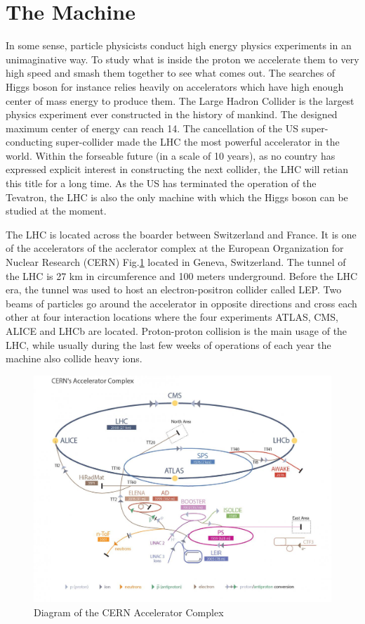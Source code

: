 \section{The Machine}

In some sense, particle physicists conduct high energy physics experiments in an unimaginative way. To study what is inside the proton we accelerate them to very high speed and smash them together to see what comes out. The searches of Higgs boson for instance relies heavily on accelerators which have high enough center of mass energy to produce them. The Large Hadron Collider is the largest physics experiment ever constructed in the history of mankind. The designed maximum center of energy can reach 14\tev. The cancellation of the US super-conducting super-collider made the LHC the most powerful accelerator in the world. Within the forseable future (in a scale of 10 years), as no country has expressed explicit interest in constructing the next collider, the LHC will retian this title for a long time. As the US has terminated the operation of the Tevatron, the LHC is also the only machine with which the Higgs boson can be studied at the moment.

The LHC is located across the boarder between Switzerland and France. It is one of the accelerators of the acclerator complex at the European Organization for Nuclear Research (CERN) Fig.\ref{fig:lhc-CERN} located in Geneva, Switzerland. The tunnel of the LHC is 27 km in circumference and 100 meters underground. Before the LHC era, the tunnel was used to host an electron-positron collider called LEP\cite{refneeded}. Two beams of particles go around the accelerator in opposite directions and cross each other at four interaction locations where the four experiments ATLAS, CMS, ALICE and LHCb are located. Proton-proton collision is the main usage of the LHC, while usually during the last few weeks of operations of each year the machine also collide heavy ions.

\begin{figure}[htpb!]
\begin{center}
  \includegraphics[width=0.7\linewidth]{figures/LHC/LHC_default}
\caption{Diagram of the CERN Accelerator Complex}
\label{fig:lhc-CERN}
\end{center}
\end{figure}


